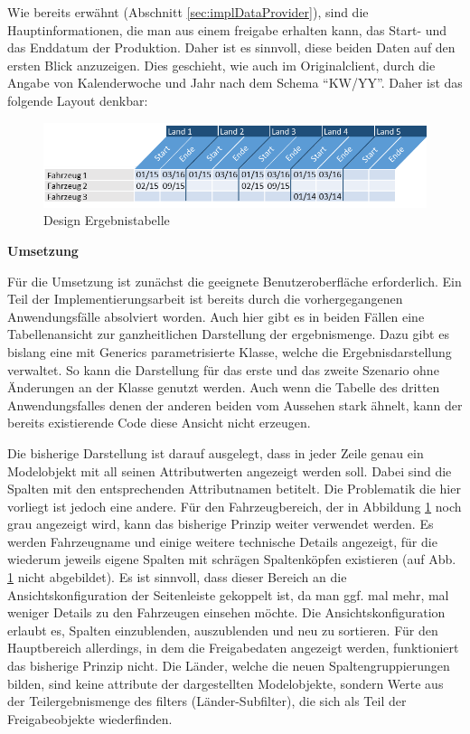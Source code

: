 Wie bereits erwähnt (Abschnitt \ref{sec:implDataProvider}), sind die Hauptinformationen, die man aus einem \gls{freigabe} erhalten kann, das Start- und das Enddatum der Produktion. Daher ist es sinnvoll, diese beiden Daten auf den ersten Blick anzuzeigen. Dies geschieht, wie auch im Originalclient, durch die Angabe von Kalenderwoche und Jahr nach dem Schema \enquote{KW/YY}. Daher ist das folgende Layout denkbar:

\begin{figure}[H]
 \centering
 \includegraphics[width=1.0\textwidth]{grafiken/Tabelle_complete.png}
 \caption{Design Ergebnistabelle}
 \label{fig:tabelle3}
\end{figure}

\textbf{Umsetzung}

Für die Umsetzung ist zunächst die geeignete Benutzeroberfläche erforderlich. Ein Teil der Implementierungsarbeit ist bereits durch die vorhergegangenen Anwendungsfälle absolviert worden. Auch hier gibt es in beiden Fällen eine Tabellenansicht zur ganzheitlichen Darstellung der \gls{ergebnismenge}. Dazu gibt es bislang eine mit Generics parametrisierte Klasse, welche die Ergebnisdarstellung verwaltet. So kann die Darstellung für das erste und das zweite Szenario ohne Änderungen an der Klasse genutzt werden. Auch wenn die Tabelle des dritten Anwendungsfalles denen der anderen beiden vom Aussehen stark ähnelt, kann der bereits existierende Code diese Ansicht nicht erzeugen.

Die bisherige Darstellung ist darauf ausgelegt, dass in jeder Zeile genau ein Modelobjekt mit all seinen Attributwerten angezeigt werden soll. Dabei sind die Spalten mit den entsprechenden Attributnamen betitelt. Die Problematik die hier vorliegt ist jedoch eine andere. Für den Fahrzeugbereich, der in Abbildung \ref{fig:tabelle3} noch grau angezeigt wird, kann das bisherige Prinzip weiter verwendet werden. Es werden Fahrzeugname und einige weitere technische Details angezeigt, für die wiederum jeweils eigene Spalten mit schrägen Spaltenköpfen existieren (auf Abb. \ref{fig:tabelle3} nicht abgebildet). Es ist sinnvoll, dass dieser Bereich an die Ansichtskonfiguration der Seitenleiste gekoppelt ist, da man ggf. mal mehr, mal weniger Details zu den Fahrzeugen einsehen möchte. Die Ansichtskonfiguration erlaubt es, Spalten einzublenden, auszublenden und neu zu sortieren. Für den Hauptbereich allerdings, in dem die Freigabedaten angezeigt werden, funktioniert das bisherige Prinzip nicht. Die Länder, welche die neuen Spaltengruppierungen bilden, sind keine \gls{attribut}e der dargestellten Modelobjekte, sondern Werte aus der Teilergebnismenge des \gls{filter}s (Länder-Subfilter), die sich als Teil der Freigabeobjekte wiederfinden.

